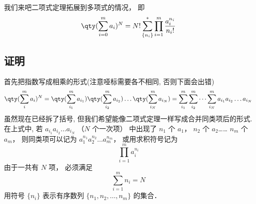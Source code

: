 

我们来吧二项式定理拓展到多项式的情况， 即
\begin{equation}
\qty(\sum_{i = 0}^m a_i)^N = N! \sum_{\{n_i\}}^* \prod_{i = 1}^m \frac{a_i^{n_i}}{n_i!}
\end{equation}

\subsection{证明}
首先把指数写成相乘的形式(注意哑标需要各不相同, 否则下面会出错)
\begin{equation}
\qty(\sum_i^m a_i)^N = \qty(\sum_{i_1}^m a_{i_1})\qty(\sum_{i_2}^m a_{i_2})\dots \qty(\sum_{i_N}^m a_{i_N}) = \sum_{i_1}^m \sum_{i_2}^m\dots \sum_{i_N}^m a_{i_1} a_{i_2}\dots a_{i_N}
\end{equation}
虽然现在已经拆了括号, 但我们希望能像二项式定理一样写成合并同类项后的形式. 在上式中, 若 $a_{i_1} a_{i_2}\dots a_{i_N}$ （$N$ 个一次项） 中出现了 $n_1$ 个 $a_1$， $n_2$ 个 $a_2$…… $n_m$ 个 $a_m$， 则同类项可以记为 $a_1^{n_1} a_2^{n_2} \dots a_m^{n_m}$， 或用求积符号记为
\begin{equation}
\prod_{i=1}^m a_i^{n_i}
\end{equation}
由于一共有 $N$ 项， 必须满足
\begin{equation}
\sum_{i=1}^m n_i = N
\end{equation}
用符号 $\{n_i\}$ 表示有序数列 $\{n_1,n_2,\dots, n_m\}$ 的集合．
